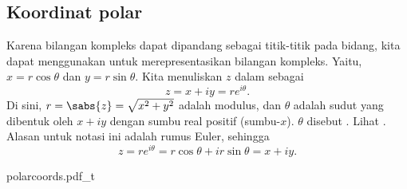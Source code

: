 
\subsection{Koordinat polar}

Karena bilangan kompleks dapat dipandang sebagai titik-titik pada bidang, kita dapat menggunakan
\emph{}
untuk merepresentasikan bilangan kompleks.
Yaitu, $x = r \cos \theta$ dan $y= r \sin \theta$.
Kita menuliskan $z$ dalam \emph{} sebagai
\begin{equation*}
z = x+iy = r e^{i \theta} .
\end{equation*}
Di sini, $r = \sabs{z} = \sqrt{x^2+y^2}$ adalah modulus, dan
$\theta$ adalah sudut yang dibentuk oleh $x+iy$ dengan sumbu real positif (sumbu-$x$).
$\theta$ disebut \emph{}. Lihat
.
Alasan untuk notasi ini adalah
rumus Euler, sehingga
\begin{equation*}
z = r e^{i\theta} = r\cos \theta + i r\sin \theta  = x+iy .
\end{equation*}

\begin{myfig}
{polarcoords.pdf_t}
\caption{Koordinat polar.\label{fig:polarcoords}}
\end{myfig}
